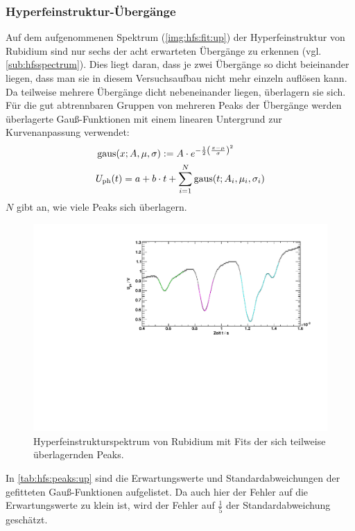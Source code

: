 \subsubsection*{Hyperfeinstruktur-Übergänge}
Auf dem aufgenommenen Spektrum (\autoref{img:hfs:fit:up}) der Hyperfeinstruktur von Rubidium sind nur sechs der acht erwarteten
Übergänge zu erkennen (vgl. \autoref{sub:hfsspectrum}). Dies liegt daran, dass je zwei Übergänge so dicht beieinander liegen,  %
dass man sie in diesem Versuchsaufbau nicht mehr
einzeln auflösen kann. Da teilweise mehrere Übergänge dicht nebeneinander liegen, überlagern sie sich. Für die gut abtrennbaren Gruppen von
mehreren Peaks der Übergänge werden überlagerte Gauß-Funktionen mit einem linearen Untergrund zur Kurvenanpassung verwendet:
\begin{equation}
    \begin{split}
        & \operatorname{gaus}(x; A, \mu, \sigma) := A \cdot e^{-\frac{1}{2} \left( \frac{x-\mu}{\sigma} \right)^2} \\
        & U_\text{ph}(t) = a + b \cdot t + \sum_{i=1}^N \operatorname{gaus}(t; A_i, \mu_i, \sigma_i)
    \end{split}
\end{equation}
$N$ gibt an, wie viele Peaks sich überlagern.
\begin{figure}[H]
\begin{center}
    \includegraphics[width=\textwidth]{../img/part2/up-hfs_zoom_fit.pdf}  %
    \caption{Hyperfeinstrukturspektrum von Rubidium mit Fits der sich teilweise überlagernden Peaks.}
    \label{img:hfs:fit:up}
\end{center}
\end{figure}
In \autoref{tab:hfs:peaks:up} sind die Erwartungswerte und Standardabweichungen der gefitteten Gauß-Funktionen aufgelistet. Da auch hier der 
Fehler auf die Erwartungswerte zu klein ist, wird der Fehler auf $\frac{1}{5}$ der Standardabweichung geschätzt.


